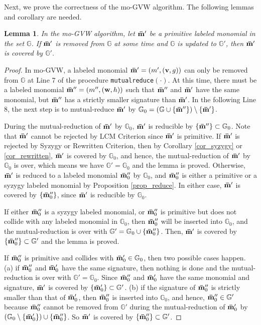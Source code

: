 \documentclass[final, number, 3p,12pt]{elsarticle}
\newtheorem{lemma}[theorem]{Lemma}
\def\G{{\mathbb{G}}}
\def\brm{{\bf \bar{m}}}
\def\v{{\bf v}}
\def\w{{\bf w}}
\begin{document}
Next, we prove the correctness of the mo-GVW algorithm. The following lemmas and corollary are needed.

\begin{lemma} \label{lem_cover}
In the mo-GVW algorithm, let $\brm'$ be a primitive labeled monomial in the set $\G$. If $\brm'$ is removed from $\G$ at some time and $\G$ is updated to $\G'$, then $\brm'$ is covered by $\G'$. %
\end{lemma}

\begin{proof}
In mo-GVW, a labeled monomial $\brm' = (m', (\v, g))$ can only be removed from $\G$ at Line 7 of the procedure {\tt mutualreduce}$(\cdot)$. At this time, there must be a labeled monomial $\brm'' = (m'', (\w, h))$ such that $\brm''$ and $\brm'$ have the same monomial, but $\brm''$ has a strictly smaller signature than $\brm'$. In the following Line 8, the next step is to mutual-reduce $\brm'$ by $\G_0 = (\G \cup \{\brm''\}) \setminus \{\brm'\}$.

During the mutual-reduction of $\brm'$ by $\G_0$, $\brm'$ is reducible by $\{\brm''\} \subset \G_0$. Note that $\brm'$ cannot be rejected by LCM Criterion since $\brm'$ is primitive. If $\brm'$ is rejected by Syzygy or Rewritten Criterion, then by Corollary \ref{cor_syzygy} or \ref{cor_rewritten}, $\brm'$ is covered by $\G_0$, and hence, the mutual-reduction of $\brm'$ by $\G_0$ is over, which means we have $\G' = \G_0$ and the lemma is proved. Otherwise, $\brm'$ is reduced to a labeled monomial $\brm''_0$ by $\G_0$, and $\brm''_0$ is either a primitive or a syzygy labeled monomial by Proposition \ref{prop_reduce}. In either case, $\brm'$ is covered by $\{\brm''_0\}$, since $\brm'$ is reducible by $\G_0$. 

If either $\brm''_0$ is a syzygy labeled monomial,  or $\brm''_0$ is primitive but does not collide with any labeled monomial in $\G_0$, then $\brm''_0$ will be inserted into $\G_0$, and the mutual-reduction is over with $\G' = \G_0 \cup \{\brm''_0\}$. Then, $\brm'$ is covered by $\{\brm''_0\} \subset \G'$ and the lemma is proved.

If $\brm''_0$ is primitive and collides with $\brm'_0 \in \G_0$, then two possible cases happen. (a) if $\brm''_0$ and $\brm'_0$ have the same signature, then nothing is done and the mutual-reduction is over with $\G' = \G_0$. Since $\brm''_0$ and $\brm'_0$ have the same monomial and signature, $\brm'$ is covered by $\{\brm'_0\} \subset \G'$. (b) if the signature of $\brm''_0$ is strictly smaller than that of $\brm'_0$, then $\brm''_0$ is inserted into $\G_0$, and hence, $\brm''_0\in \G'$ because $\brm''_0$ cannot be removed from $\G'$ during the mutual-reduction of $\brm'_0$ by $(\G_0 \setminus \{\brm'_0\}) \cup \{\brm''_0\}$. So $\brm'$ is covered by $\{\brm''_0\} \subset \G'$. 
\end{proof}
\end{document}

